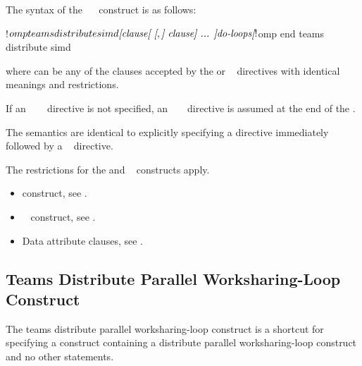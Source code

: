 \begin{fortranspecific}
The syntax of the ~~ construct is as follows:

\begin{ompfPragma}
!$omp teams distribute simd \plc{[clause[ [},\plc{] clause] ... ]}
    \plc{do-loops}
\plc{[}!$omp end teams distribute simd\plc{]}
\end{ompfPragma}

where  can be any of the clauses accepted by the  or 
~ directives with identical meanings and restrictions.

If an ~~~ directive is
not specified, an ~ ~
directive is assumed at the end of the .
\end{fortranspecific}

\descr
The semantics are identical to explicitly specifying a  directive 
immediately followed by a ~ directive.

\restrictions
The restrictions for the  and ~ 
constructs apply.

\crossreferences
\begin{itemize}
\item {} construct, see
.

\item {}~ construct, see
.

\item Data attribute clauses, see
.
\end{itemize}



\subsection{Teams Distribute Parallel Worksharing-Loop Construct}
\label{subsec:Teams Distribute Parallel Worksharing-Loop Construct}
\summary
The teams distribute parallel worksharing-loop construct is a shortcut 
for specifying a  construct containing a distribute parallel 
worksharing-loop construct and no other statements.

